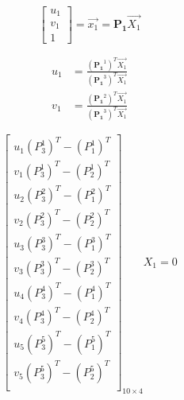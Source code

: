 \documentclass{article}
\begin{document}
\begin{equation}
    \begin{bmatrix} u_1 \\ v_1 \\ 1 \end{bmatrix} = \vec{x_1} = \mathbf{P_1} \vec{X_1}
\end{equation}

\begin{align}
    u_1 &= \frac{(\mathbf{P_1}^1)^T \vec{X_1}}{(\mathbf{P_1}^3)^T \vec{X_1}} \\
    v_1 &= \frac{(\mathbf{P_1}^2)^T \vec{X_1}}{(\mathbf{P_1}^3)^T \vec{X_1}}
\end{align}



\begin{equation*}
    \begin{bmatrix}
    u_1 (P_3^1)^T - (P_1^1)^T \\
    v_1 (P_3^1)^T - (P_2^1)^T \\
    u_2 (P_3^2)^T - (P_1^2)^T \\
    v_2 (P_3^2)^T - (P_2^2)^T \\
    u_3 (P_3^3)^T - (P_1^3)^T \\
    v_3 (P_3^3)^T - (P_2^3)^T \\
    u_4 (P_3^4)^T - (P_1^4)^T \\
    v_4 (P_3^4)^T - (P_2^4)^T \\
    u_5 (P_3^5)^T - (P_1^5)^T \\
    v_5 (P_3^5)^T - (P_2^5)^T \\
    \end{bmatrix}_{10 \times 4}
    {X_1} = 0
\end{equation*}
\end{document}
